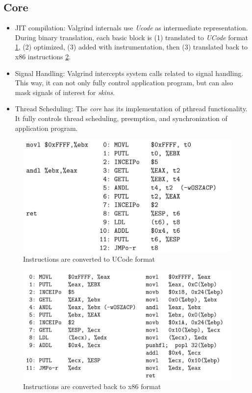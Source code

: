 \subsection{Core}

\begin{itemize}
    \item \ac{JIT} compilation: Valgrind internals use \textit{Ucode} as intermediate representation. During binary translation, each basic block is (1) translated to \textit{UCode} format \cref{fig:valgrind_UCode}, (2) optimized, (3) added with instrumentation, then (3) translated back to x86 instructions \cref{fig:valgrind_UCode_back}.
    \item Signal Handling: Valgrind intercepts system calls related to signal handling. This way, it can not only fully control application program, but can also mask signals of interest for \textit{skins}.
    \item Thread Scheduling: The \textit{core} has its implementation of pthread functionality. It fully controls thread scheduling, preemption, and synchronization of application program.
\end{itemize}

\begin{figure}
    \centering
    \includegraphics[width=0.55\linewidth]{figures/Valgrind_UCode.png}
    \caption{Instructions are converted to UCode format\cite{valgrind}}
    \label{fig:valgrind_UCode}
\end{figure}

\begin{figure}
    \centering
    \includegraphics[width=0.55\linewidth]{figures/Valgrind_UCode_2.png}
    \caption{Instructions are converted back to x86 format\cite{valgrind}}
    \label{fig:valgrind_UCode_back}
\end{figure}


